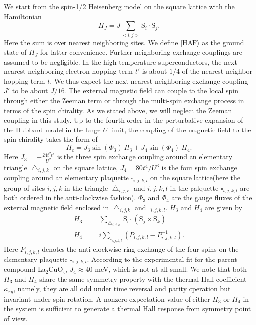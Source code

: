 \documentclass[prb,twocolumn,showpacs]{revtex4}
\begin{document}
We start from the spin-1/2 Heisenberg model on the square lattice with the Hamiltonian
\begin{equation}
H_{J}=J\sum_{<i,j>} \mathrm{S}_{i} \cdot \mathrm{S}_{j}.
\end{equation}
Here the sum is over nearest neighboring sites. We define $|\mathrm{HAF}\rangle$ as the ground state of $H_{J}$ for latter convenience. Further neighboring exchange couplings are assumed to be negligible. In the high temperature superconductors, the next-nearest-neighboring electron hopping term $t'$ is about $1/4$ of the nearest-neighbor hopping term $t$. We thus expect the next-nearest-neighboring exchange coupling $J'$  to be about $J/16$. The external magnetic field can couple to the local spin through either the Zeeman term or through the multi-spin exchange process in terms of the spin chirality. As we stated above, we will neglect the Zeeman coupling in this study. Up to the fourth order in the perturbative expansion of the Hubbard model in the large $U$ limit, the coupling of the magnetic field to the spin chirality takes the form of
\begin{equation}
H_{c}=J_{3}\sin(\Phi_{3})\ H_{3}+J_{4}\sin(\Phi_{4})\ H_{4}.
\end{equation} 
Here $J_{3}=-\frac{24t^{2}t'}{U^{2}}$ is the three spin exchange coupling around an elementary triangle $\bigtriangleup_{i,j,k}$ on the square lattice,  $J_{4}=80t^{4}/U^{3}$ is the four spin exchange coupling around an elementary plaquette $\square_{i,j,k,l}$ on the square lattice(here the group of sites $i,j,k$ in the triangle $\bigtriangleup_{i,j,k}$ and $i,j,k,l$ in the palquette $\square_{i,j,k,l}$ are both ordered in the anti-clockwise fashion). $\Phi_{3}$ and $\Phi_{4}$ are the gauge fluxes of the external magnetic field enclosed in $\bigtriangleup_{i,j,k}$ and $\square_{i,j,k,l}$. $H_{3}$ and $H_{4}$ are given by
\begin{eqnarray}
H_{3}&=&\sum_{\bigtriangleup_{i,j,k}} \ \mathrm{S}_{i}\cdot (\mathrm{S}_{j}\times\mathrm{S}_{k})\nonumber\\
H_{4}&=&i\sum_{\square_{i,j,k,l}} (P_{i,j,k,l}-P^{-1}_{i,j,k,l}).
\end{eqnarray}
Here $P_{i,j,k,l}$ denotes the anti-clockwise ring exchange of the four spins on the elementary plaquette $\square_{i,j,k,l}$.  According to the experimental fit for the parent compound La$_{2}$CuO$_{4}$, $J_{4}\approx 40$ meV, which is not at all small\cite{LCO}. We note that both $H_{3}$ and $H_{4}$ share the same symmetry property with the thermal Hall coefficient $\kappa_{xy}$, namely, they are all odd under time reversal and parity operation but invariant under spin rotation.  A nonzero expectation value of either $H_{3}$ or $H_{4}$ in the system is sufficient to generate a thermal Hall response from symmetry point of view.
\end{document}
